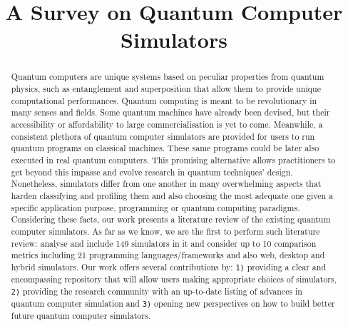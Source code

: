 \documentclass[conference]{IEEEtran}
\begin{document}
\title{A Survey on Quantum Computer Simulators}

\author{
}
\maketitle

\begin{abstract}
Quantum computers are unique systems based on peculiar properties from quantum physics, such as entanglement and superposition that allow them to provide unique computational performances. Quantum computing is meant to be revolutionary in many senses and fields. Some quantum machines have already been devised, but their accessibility or affordability to large commercialisation is yet to come. Meanwhile, a consistent plethora of quantum computer simulators are provided for users to run quantum programs on classical machines. These same programs could be later also executed in real quantum computers. This promising alternative allows practitioners to get beyond this impasse and evolve research in quantum techniques' design. Nonetheless, simulators differ from one another in many overwhelming aspects that harden classifying and profiling them and also choosing the most adequate one given a specific application purpose, programming or quantum computing paradigms. Considering these facts, our work presents a literature review of the existing quantum computer simulators. As far as we know, we are the first to perform such literature review: analyse  and include 149 simulators in it and consider up to 10 comparison metrics including 21 programming languages/frameworks and also web, desktop and hybrid simulators. Our work offers several contributions by: \texttt{1)} providing a clear and encompassing repository that will allow users making appropriate choices of simulators, \texttt{2)} providing the research community with an up-to-date listing of advances in quantum computer simulation and \texttt{3)} opening new perspectives on how to build better future quantum computer simulators. 
\end{abstract}
\end{document}
